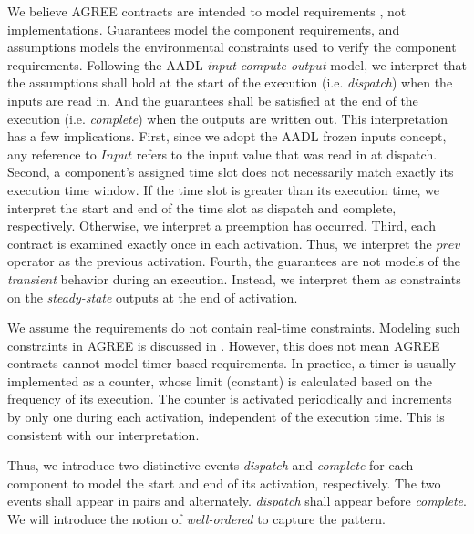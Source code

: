 We believe AGREE contracts are intended to model requirements \cite{AGREE2}, not implementations. Guarantees model the component requirements, and assumptions models the environmental constraints used to verify the component requirements. Following the AADL \emph{input-compute-output} model, we interpret that the assumptions shall hold at the start of the execution (i.e. \emph{dispatch}) when the inputs are read in. And the guarantees shall be satisfied at the end of the execution (i.e. \emph{complete}) when the outputs are written out. This interpretation has a few implications. 
First, since we adopt the AADL frozen inputs concept, any reference to $Input$ refers to the input value that was read in at dispatch.
Second, a component's assigned time slot does not necessarily match exactly its execution time window. If the time slot is greater than its execution time, we interpret the start and end of the time slot as dispatch and complete, respectively. Otherwise, we interpret a preemption has occurred.
Third, each contract is examined exactly once in each activation. Thus, we interpret the $prev$ operator as the previous activation. 
Fourth, the guarantees are not models of the \emph{transient} behavior during an execution. Instead, we interpret them as constraints on the \emph{steady-state} outputs at the end of activation.

We assume the requirements do not contain real-time constraints. Modeling such constraints in AGREE is discussed in \cite{rtAGREE}.
However, this does not mean AGREE contracts cannot model timer based requirements. In practice, a timer is usually implemented as a counter, whose limit (constant) is calculated based on the frequency of its execution. The counter is activated periodically and increments by only one during each activation, independent of the execution time. This is consistent with our interpretation.

Thus, we introduce two distinctive events \emph{dispatch} and \emph{complete} for each component to model the start and end of its activation, respectively. 
The two events shall appear in pairs and alternately. \emph{dispatch} shall appear before \emph{complete}. We will introduce the notion of \emph{well-ordered} to capture the pattern.

